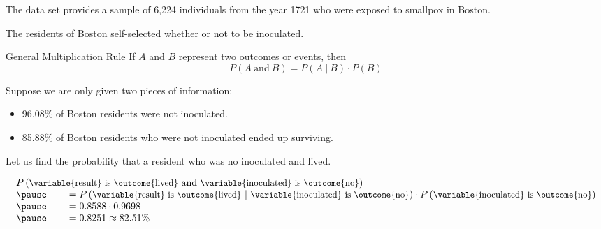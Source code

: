 \documentclass{beamer}
\newcommand{\prob}[1]{P\left({#1}\right)}
\newcommand{\jointprob}[3]{\prob{{#1}~\text{#2}~{#3}}}
\newcommand{\condprob}[2]{\prob{{#1}~|~{#2}}}
\begin{document}
\begin{frame}
\begin{example}
The  data set provides a sample of 6,224 individuals from the year 1721 who were exposed to smallpox in Boston.

\vspace{2mm}
The residents of Boston self-selected whether or not to be inoculated.

\vspace{2mm}
\pause{}\pause

\vspace{2mm}
\pause
{}\pause

\vspace{2mm}
\pause
{}
\end{example}
\end{frame}

\begin{frame}
\begin{block}{General Multiplication Rule}
If $A$ and $B$ represent two outcomes or events, then
\begin{equation*}
\jointprob{A}{and}{B} = \condprob{A}{B}\cdot\prob{B}
\end{equation*}
\end{block}\pause

\begin{example}
Suppose we are only given two pieces of information: 
\begin{itemize}
\item 96.08\% of Boston residents were not inoculated.
\item 85.88\% of Boston residents who were not inoculated ended up surviving.
\end{itemize}
Let us find the probability that a resident who was no inoculated  and lived.\pause

\vspace{-5mm}
\begin{equation*}
\begin{array}{l}
\jointprob{\text{\small\variable{result} is \outcome{lived}}}{and}{\text{\small\variable{inoculated} is \outcome{no}}} \\\pause
\qquad= \condprob{\text{\small\variable{result} is \outcome{lived}}}{\text{\small\variable{inoculated} is \outcome{no}}} \cdot \prob{\text{\small\variable{inoculated} is \outcome{no}}}\\\pause
\qquad= 0.8588 \cdot 0.9698\\\pause
\qquad= 0.8251 \approx 82.51\%
\end{array}
\end{equation*}
\end{example}
\end{frame}
\end{document}
